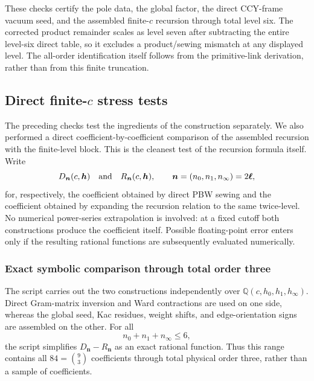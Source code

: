 \documentclass[11pt]{article}
\begin{document}
These checks certify the pole data, the global factor, the direct CCY-frame
vacuum seed, and the assembled finite-\(c\) recursion through total level six.
The corrected product remainder scales as level seven after subtracting the
entire level-six direct table, so it excludes a product/sewing mismatch at
any displayed level.  The all-order identification itself follows from the
primitive-link derivation, rather than from this finite truncation.

\subsection{\texorpdfstring{Direct finite-\(c\) stress tests}
{Direct finite-c stress tests}}
\label{sec:coefficient-stress-tests}

The preceding checks test the ingredients of the construction separately.
We also performed a direct coefficient-by-coefficient comparison of the
assembled recursion with the finite-level block.  This is the cleanest
test of the recursion formula itself.  Write
\begin{equation}
 D_{\bm n}(c,\bm h)
 \quad\hbox{and}\quad
 R_{\bm n}(c,\bm h),
 \qquad \bm n=(n_0,n_1,n_\infty)=2\bm\ell,
 \label{eq:direct-recursive-coefficients}
\end{equation}
for, respectively, the coefficient obtained by direct PBW sewing and the
coefficient obtained by expanding the recursion relation to the same
twice-level.  No numerical power-series extrapolation is involved: at a
fixed cutoff both constructions produce the coefficient itself.  Possible
floating-point error enters only if the resulting rational functions are
subsequently evaluated numerically.

\subsubsection{Exact symbolic comparison through total order three}

The script  carries out the two
constructions independently over
\(\mathbb Q(c,h_0,h_1,h_\infty)\).  Direct Gram-matrix inversion and Ward
contractions are used on one side, whereas the global seed, Kac residues,
weight shifts, and edge-orientation signs are assembled on the other.  For
all
\begin{equation}
 n_0+n_1+n_\infty\leq 6,
 \label{eq:symbolic-check-range}
\end{equation}
the script simplifies \(D_{\bm n}-R_{\bm n}\) as an exact rational
function.  Thus this range contains all \(84=\binom{9}{3}\) coefficients
through total physical order three, rather than a sample of coefficients.
\end{document}
